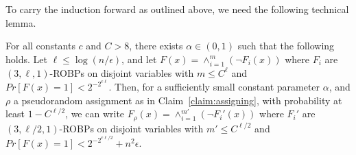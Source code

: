 To carry the induction forward as outlined above, we need the following technical lemma. 

\begin{claim}\label{claim:simplifyerror}
For all constants $c$ and $C > 8$, there exists $\alpha \in (0,1)$ such that the following holds. Let $\ell \leq \log(n/\epsilon)$, and let $F(x) = \wedge_{i=1}^m (\neg F_i(x))$ where $F_i$ are $(3,\ell,1)$-ROBPs on disjoint variables with $m \leq C^\ell$ and $Pr[F(x) = 1] < 2^{-2^{c \ell}}$. Then, for a sufficiently small constant parameter $\alpha$, and $\rho$ a pseudorandom assignment as in Claim~\ref{claim:assigning}, with probability at least $1 - C^{\ell/2}$, we can write $F_\rho(x) = \wedge_{i=1}^{m'} (\neg F_i'(x))$ where $F_i'$ are $(3,\ell/2,1)$-ROBPs on disjoint variables with $m' \leq C^{\ell/2}$ and $Pr[F(x) = 1] < 2^{-2^{c \ell/2}} + n^2 \epsilon$. 
\end{claim} 
